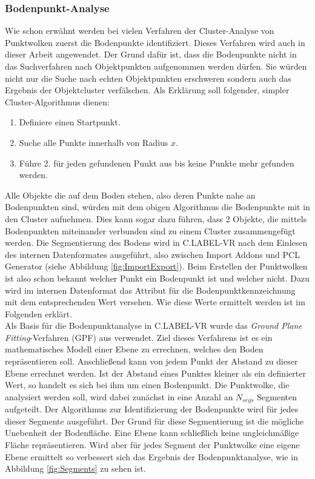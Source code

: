 \subsubsection{Bodenpunkt-Analyse}
Wie schon erwähnt werden bei vielen Verfahren der Cluster-Analyse von Punktwolken zuerst die Bodenpunkte identifiziert. Dieses Verfahren wird auch in dieser Arbeit angewendet. Der Grund dafür ist, dass die Bodenpunkte nicht in das Suchverfahren nach Objektpunkten aufgenommen werden dürfen. Sie würden nicht nur die Suche nach echten Objektpunkten erschweren sondern auch das Ergebnis der Objektcluster verfälschen. Als Erklärung soll folgender, simpler Cluster-Algorithmus dienen:

\begin{enumerate}
\item Definiere einen Startpunkt.
\item Suche alle Punkte innerhalb von Radius \(x\). 
\item Führe 2. für jeden gefundenen Punkt aus bis keine Punkte mehr gefunden werden.
\end{enumerate} 

Alle Objekte die auf dem Boden stehen, also deren Punkte nahe an Bodenpunkten sind, würden mit dem obigen Algorithmus die Bodenpunkte mit in den Cluster aufnehmen. Dies kann sogar dazu führen, dass 2 Objekte, die mittels Bodenpunkten miteinander verbunden sind zu einem Cluster zusammengefügt werden. Die Segmentierung des Bodens wird in C.LABEL-VR nach dem Einlesen des internen Datenformates ausgeführt, also zwischen Import Addons und PCL Generator (siehe Abbildung \ref{fig:ImportExport}). Beim Erstellen der Punktwolken ist also schon bekannt welcher Punkt ein Bodenpunkt ist und welcher nicht. Dazu wird im internen Datenformat das Attribut für die Bodenpunktkennzeichnung mit dem entsprechenden Wert versehen. Wie diese Werte ermittelt werden ist im Folgenden erklärt.\\

Als Basis für die Bodenpunktanalyse in C.LABEL-VR wurde das \textit{Ground Plane Fitting}-Verfahren (GPF) aus \cite{bib:Segmentation1} verwendet. Ziel dieses Verfahrens ist es ein mathematisches Modell einer Ebene zu errechnen, welches den Boden repräsentieren soll. Anschließend kann von jedem Punkt der Abstand zu dieser Ebene errechnet werden. Ist der Abstand eines Punktes kleiner als ein definierter Wert, so handelt es sich bei ihm um einen Bodenpunkt. Die Punktwolke, die analysiert werden soll, wird dabei zunächst in eine Anzahl an $N_{segs}$ Segmenten aufgeteilt. Der Algorithmus zur Identifizierung der Bodenpunkte wird für jedes dieser Segmente ausgeführt. Der Grund für diese Segmentierung ist die mögliche Unebenheit der Bodenfläche. Eine Ebene kann schließlich keine ungleichmäßige Fläche repräsentieren. Wird aber für jedes Segment der Punktwolke eine eigene Ebene ermittelt so verbessert sich das Ergebnis der Bodenpunktanalyse, wie in Abbildung \ref{fig:Segments} zu sehen ist.\\

